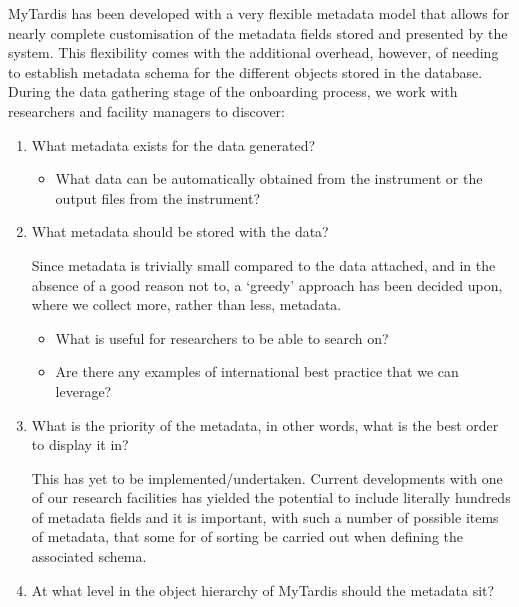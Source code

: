 \documentclass[letterpaper,10pt,english]{sphinxmanual}
\begin{document}
\sphinxAtStartPar
MyTardis has been developed with a very flexible metadata model that allows for nearly complete customisation of the metadata fields stored and presented by the system. This flexibility comes with the additional overhead, however, of needing to establish metadata schema for the different objects stored in the database. During the data gathering stage of the onboarding process, we work with researchers and facility managers to discover:
\begin{enumerate}
%
\item {}
\sphinxAtStartPar
What metadata exists for the data generated?
\begin{itemize}
\item {}
\sphinxAtStartPar
What data can be automatically obtained from the instrument or the output files from the instrument?

\end{itemize}

\item {}
\sphinxAtStartPar
What metadata should be stored with the data? %
\begin{footnote}[2]\sphinxAtStartFootnote
Since metadata is trivially small compared to the data attached, and in the absence of a good reason not to, a ‘greedy’ approach has been decided upon, where we collect more, rather than less, metadata.
%
\end{footnote}
\begin{itemize}
\item {}
\sphinxAtStartPar
What is useful for researchers to be able to search on?

\item {}
\sphinxAtStartPar
Are there any examples of international best practice that we can leverage?

\end{itemize}

\item {}
\sphinxAtStartPar
What is the priority of the metadata, in other words, what is the best order to display it in? %
\begin{footnote}[3]\sphinxAtStartFootnote
This has yet to be implemented/undertaken. Current developments with one of our research facilities has yielded the potential to include literally hundreds of metadata fields and it is important, with such a number of possible items of metadata, that some for of sorting be carried out when defining the associated schema.
%
\end{footnote}

\item {}
\sphinxAtStartPar
At what level in the object hierarchy of MyTardis should the metadata sit?

\end{enumerate}
\end{document}
